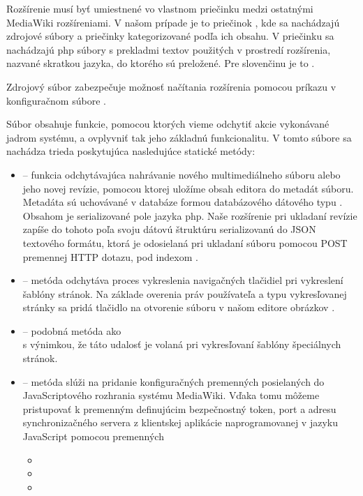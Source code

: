 Rozšírenie musí byť umiestnené vo vlastnom priečinku medzi ostatnými MediaWiki rozšíreniami. V našom prípade je to priečinok , kde sa nachádzajú zdrojové súbory a priečinky kategorizované podľa ich obsahu. V priečinku  sa nachádzajú php súbory s prekladmi textov použitých v prostredí rozšírenia, nazvané skratkou jazyka, do ktorého sú preložené. Pre slovenčinu je to .

Zdrojový súbor  zabezpečuje možnosť načítania rozšírenia pomocou príkazu  v konfiguračnom súbore .

Súbor  obsahuje funkcie, pomocou ktorých vieme odchytiť akcie vykonávané jadrom systému, a ovplyvniť tak jeho základnú funkcionalitu. V tomto súbore sa nachádza trieda  poskytujúca nasledujúce statické metódy:

\begin{itemize}
	\item {} -- funkcia odchytávajúca nahrávanie nového multimediálneho súboru alebo jeho novej revízie, pomocou ktorej uložíme obsah editora do metadát súboru. Metadáta sú uchovávané v databáze formou databázového dátového typu . Obsahom je serializované pole jazyka php. Naše rozšírenie pri ukladaní revízie zapíše do tohoto poľa svoju dátovú štruktúru serializovanú do JSON textového formátu, ktorá je odosielaná pri ukladaní súboru pomocou POST premennej HTTP dotazu, pod indexom .
	
	\item {} -- metóda odchytáva proces vykreslenia navigačných tlačidiel pri vykreslení šablóny stránok. Na základe overenia práv používateľa a typu vykresľovanej stránky sa pridá tlačidlo na otvorenie súboru v našom editore obrázkov .
	
	\item {} -- podobná metóda ako \\
	 s výnimkou, že táto udalosť je volaná pri vykresľovaní šablóny špeciálnych stránok.
	
	\item {} -- metóda slúži na pridanie konfiguračných premenných posielaných do JavaScriptového rozhrania systému MediaWiki. Vďaka tomu môžeme pristupovať k premenným definujúcim bezpečnostný token, port a adresu synchronizačného servera z klientskej aplikácie naprogramovanej v jazyku JavaScript pomocou premenných 
	\begin{itemize}
		\item {}
		\item {}
		\item {}
	\end{itemize}
\end{itemize}

